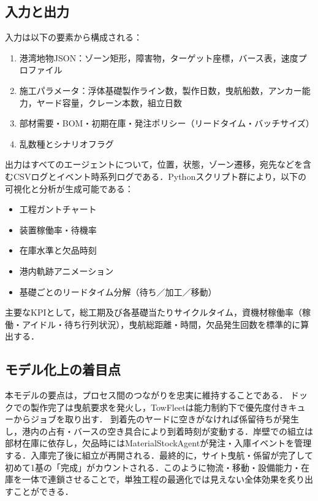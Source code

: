 \documentclass[10pt,letterpaper]{jsarticle}
\begin{document}
\subsection{入力と出力}
入力は以下の要素から構成される：

\begin{enumerate}
  \item 港湾地物JSON：ゾーン矩形，障害物，ターゲット座標，バース表，速度プロファイル
  \item 施工パラメータ：浮体基礎製作ライン数，製作日数，曳航船数，アンカー能力，ヤード容量，クレーン本数，組立日数
  \item 部材需要・BOM・初期在庫・発注ポリシー（リードタイム・バッチサイズ）
  \item 乱数種とシナリオフラグ
\end{enumerate}

出力はすべてのエージェントについて，位置，状態，ゾーン遷移，宛先などを含むCSVログとイベント時系列ログである．Pythonスクリプト群により，以下の可視化と分析が生成可能である：

\begin{itemize}
  \item 工程ガントチャート
  \item 装置稼働率・待機率
  \item 在庫水準と欠品時刻
  \item 港内軌跡アニメーション
  \item 基礎ごとのリードタイム分解（待ち／加工／移動）
\end{itemize}

主要なKPIとして，総工期及び各基礎当たりサイクルタイム，資機材稼働率（稼働・アイドル・待ち行列状況），曳航総距離・時間，欠品発生回数を標準的に算出する．

\subsection{モデル化上の着目点}
本モデルの要点は，プロセス間のつながりを忠実に維持することである．
ドックでの製作完了は曳航要求を発火し，TowFleetは能力制約下で優先度付きキューからジョブを取り出す．
到着先のヤードに空きがなければ係留待ちが発生し，港内の占有・バースの空き具合により到着時刻が変動する．岸壁での組立は部材在庫に依存し，欠品時にはMaterialStockAgentが発注・入庫イベントを管理する．入庫完了後に組立が再開される．最終的に，サイト曳航・係留が完了して初めて1基の「完成」がカウントされる．このように物流・移動・設備能力・在庫を一体で連鎖させることで，単独工程の最適化では見えない全体効果を炙り出すことができる．
\end{document}
